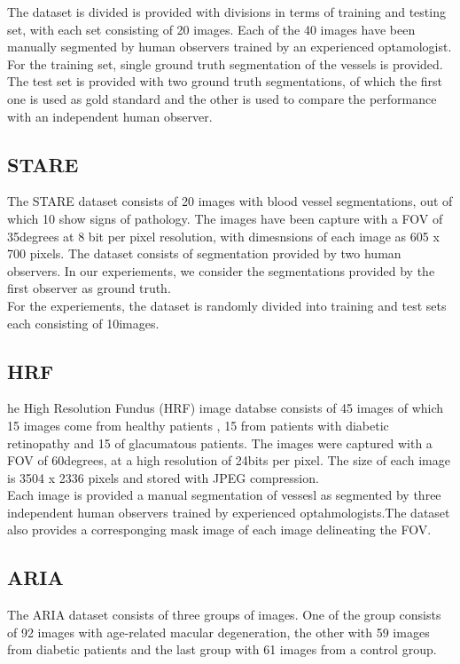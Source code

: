 The dataset is divided is provided with divisions in terms of training and testing set, with each set consisting of 20 images. Each of the 40 images have been manually segmented by human observers trained by an experienced optamologist. For the training set, single ground truth segmentation of the vessels is provided. The test set is provided with two ground truth segmentations, of which the first one is used as gold standard and the other is used to compare the performance with an independent human observer.\\

\subsection{STARE}
The STARE dataset consists of 20 images with blood vessel segmentations, out of which 10 show signs of pathology. The images have been capture with a FOV of 35degrees at 8 bit per pixel resolution, with dimesnsions of each image as 605 x 700 pixels. The dataset consists of segmentation provided by two human observers. In our experiements, we consider the segmentations provided by the first observer as ground truth.\\

For the experiements, the dataset is randomly divided into training and test sets each consisting of 10images.

\subsection{HRF}
he High Resolution Fundus (HRF) image databse consists of 45 images of which 15 images come from healthy patients , 15 from patients with diabetic retinopathy and 15 of glacumatous patients. The images were captured with a FOV of 60degrees, at a high resolution of 24bits per pixel. The size of each image is 3504 x 2336 pixels and stored with JPEG compression. \\

Each image is provided a manual segmentation of vessesl as segmented by three independent human observers trained by experienced optahmologists.The dataset also provides a corresponging mask image of each image delineating the FOV.

\subsection{ARIA}
The ARIA dataset consists of three groups of images. One of the group consists of 92 images with age-related macular degeneration, the other with 59 images from diabetic patients and the last group with 61 images from a control group.\\

